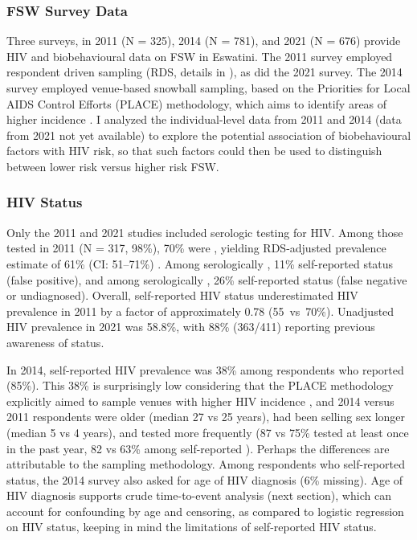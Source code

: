 \subsubsection{FSW Survey Data}\label{model.par.fsw.data}
Three surveys, in
2011 \cite{Baral2014} (N = 325),
2014 \cite{EswKP2014} (N = 781), and
2021 \cite{EswIBBS2022} (N = 676)
provide HIV and biobehavioural data on FSW in Eswatini.
The 2011 survey employed respondent driven sampling (RDS, details in \cite{Yam2013}),
as did the 2021 survey.
The 2014 survey employed venue-based snowball sampling, based on the
Priorities for Local AIDS Control Efforts (PLACE) methodology,
which aims to identify areas of higher incidence \cite{Weir2005}.
I analyzed the individual-level data from 2011 and 2014 (data from 2021 not yet available)
to explore the potential association of biobehavioural factors with HIV risk,
so that such factors could then be used to distinguish between
lower risk versus higher risk FSW.
\subsubsection{HIV Status}\label{model.par.fsw.hiv}
Only the 2011 and 2021 studies included serologic testing for HIV.
Among those tested in 2011 (N = 317, 98\%), 70\% were \hivp,
yielding RDS-adjusted prevalence estimate of 61\% (CI: 51--71\%) \cite{Baral2014}.
Among serologically \hivn, 11\% self-reported \hivp status (false positive), and
among serologically \hivp, 26\% self-reported \hivn status (false negative or undiagnosed).
Overall, self-reported HIV status underestimated HIV prevalence in 2011
by a factor of approximately 0.78 (55~vs~70\%).
Unadjusted HIV prevalence in 2021 was 58.8\%,
with 88\% (363/411) reporting previous awareness of \hivp status.
\par
In 2014, self-reported HIV prevalence was 38\% among respondents who reported (85\%).
This 38\% is surprisingly low considering that
the PLACE methodology explicitly aimed to sample venues
with higher HIV incidence \cite{Weir2005}, and 2014 versus 2011 respondents
were older (median 27 vs 25 years), %
had been selling sex longer (median 5 vs 4 years), %
and tested more frequently (87 vs 75\% tested at least once in the past year, %
82 vs 63\% among self-reported \hivn).
Perhaps the differences are attributable to the sampling methodology.
Among respondents who self-reported \hivp status,
the 2014 survey also asked for age of HIV diagnosis (6\% missing).
Age of HIV diagnosis supports crude time-to-event analysis (next section),
which can account for confounding by age and censoring,
as compared to logistic regression on HIV status,
keeping in mind the limitations of self-reported HIV status.
